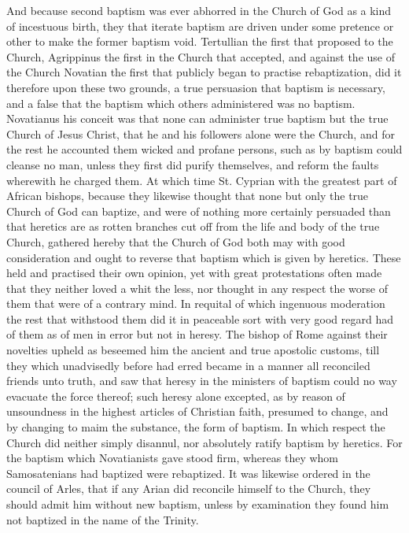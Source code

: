And because second baptism was ever abhorred in the Church of God as a kind of incestuous birth, they that iterate baptism are driven under some pretence or other to make the former baptism void. Tertullian the first that proposed to the Church, Agrippinus the first in the Church  that accepted, and against the use of the Church Novatian the first that publicly began to practise rebaptization, did it therefore upon these two grounds, a true persuasion that baptism is necessary, and a false that the baptism which others administered was no baptism. Novatianus his conceit was that none can administer true baptism but the true Church of Jesus Christ, that he and his followers alone were the Church, and for the rest he accounted them wicked and profane persons, such as by baptism could cleanse no man, unless they first did purify themselves, and reform the faults wherewith he charged them. At which time St. Cyprian with the greatest part of African bishops, because they likewise thought that none but only the true Church of God can baptize, and were of nothing more certainly persuaded than that heretics are as rotten branches cut off from the life and body of the true Church, gathered hereby that the Church of God both may with good consideration and ought to reverse that baptism which is given by heretics. These held and practised their own opinion, yet with great protestations often made that they neither loved a whit the less, nor thought in any respect the worse of them that were of a contrary mind. In requital of which ingenuous moderation the rest that withstood them did it in peaceable sort with very good regard had of them as of men in error but not in heresy.
The bishop of Rome against their novelties upheld as beseemed him the ancient and true apostolic customs, till they which unadvisedly before had erred became in a manner all reconciled friends unto truth, and saw that heresy in the ministers of baptism could no way evacuate the force thereof; such heresy alone excepted, as by reason of  unsoundness in the highest articles of Christian faith, presumed to change, and by changing to maim the substance, the form of baptism. In which respect the Church did neither simply disannul, nor absolutely ratify baptism by heretics. For the baptism which Novatianists gave stood firm, whereas they whom Samosatenians had baptized were rebaptized. It was likewise ordered in the council of Arles, that if any Arian did reconcile himself to the Church, they should admit him without new baptism, unless by examination they found him not baptized in the name of the Trinity.
